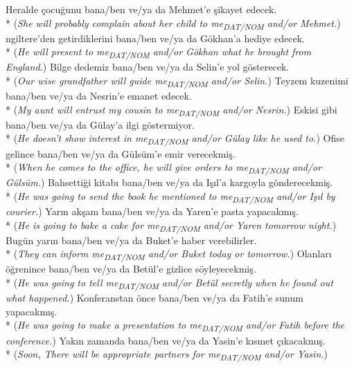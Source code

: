 \ex Heralde \c{c}ocu\u{g}unu bana/ben ve/ya da Mehmet'e \c{s}ikayet edecek. \\*
({\it She will probably complain about her child to me\textsubscript{DAT/NOM} and/or Mehmet.})
ngiltere'den getirdiklerini bana/ben ve/ya da G\"{o}khan'a hediye edecek. \\*
({\it He will present to me\textsubscript{DAT/NOM} and/or Gökhan what he brought from England.})
\ex Bilge dedemiz bana/ben ve/ya da Selin'e yol g\"{o}sterecek. \\*
({\it Our wise grandfather will guide me\textsubscript{DAT/NOM} and/or Selin.})
\ex Teyzem kuzenimi bana/ben ve/ya da Nesrin'e emanet edecek. \\*
({\it My aunt will entrust my cousin to me\textsubscript{DAT/NOM} and/or Nesrin.})
\ex Eskisi gibi bana/ben ve/ya da G\"{u}lay'a ilgi g\"{o}stermiyor. \\*
({\it He doesn't show interest in me\textsubscript{DAT/NOM} and/or G\"{u}lay like he used to.})
\ex Ofise gelince bana/ben ve/ya da G\"{u}ls\"{u}m'e emir verecekmi\c{s}. \\*
({\it When he comes to the office, he will give orders to me\textsubscript{DAT/NOM} and/or G\"{u}ls\"{u}m.})
\ex Bahsetti\u{g}i kitab{\i} bana/ben ve/ya da I\c{s}{\i}l'a kargoyla g\"{o}nderecekmi\c{s}. \\*
({\it He was going to send the book he mentioned to me\textsubscript{DAT/NOM} and/or I\c{s}{\i}l by courier.})
\ex Yar{\i}n ak\c{s}am bana/ben ve/ya da Yaren'e pasta yapacakm{\i}\c{s}. \\*
({\it He is going to bake a cake for me\textsubscript{DAT/NOM} and/or Yaren tomorrow night.})
\ex Bug\"{u}n yar{\i}n bana/ben ve/ya da Buket'e haber verebilirler. \\*
({\it They can inform me\textsubscript{DAT/NOM} and/or Buket today or tomorrow.})
\ex Olanlar{\i} \"{o}\u{g}renince bana/ben ve/ya da Bet\"{u}l'e gizlice s\"{o}yleyecekmi\c{s}. \\*
({\it He was going to tell me\textsubscript{DAT/NOM} and/or Bet\"{u}l secretly when he found out what happened.})
\ex Konferanstan \"{o}nce bana/ben ve/ya da Fatih'e sunum yapacakm{\i}\c{s}. \\*
({\it He was going to make a presentation to me\textsubscript{DAT/NOM} and/or Fatih before the conference.})
\ex Yak{\i}n zamanda bana/ben ve/ya da Yasin'e k{\i}smet \c{c}{\i}kacakm{\i}\c{s}. \\*
({\it Soon, There will be appropriate partners for me\textsubscript{DAT/NOM} and/or Yasin.})
